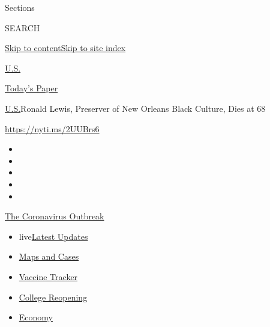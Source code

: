 Sections

SEARCH

\protect\hyperlink{site-content}{Skip to
content}\protect\hyperlink{site-index}{Skip to site index}

\href{https://www.nytimes3xbfgragh.onion/section/us}{U.S.}

\href{https://myaccount.nytimes3xbfgragh.onion/auth/login?response_type=cookie\&client_id=vi}{}

\href{https://www.nytimes3xbfgragh.onion/section/todayspaper}{Today's
Paper}

\href{/section/us}{U.S.}\textbar{}Ronald Lewis, Preserver of New Orleans
Black Culture, Dies at 68

\url{https://nyti.ms/2UUBrs6}

\begin{itemize}
\item
\item
\item
\item
\item
\end{itemize}

\href{https://www.nytimes3xbfgragh.onion/news-event/coronavirus?action=click\&pgtype=Article\&state=default\&region=TOP_BANNER\&context=storylines_menu}{The
Coronavirus Outbreak}

\begin{itemize}
\tightlist
\item
  live\href{https://www.nytimes3xbfgragh.onion/2020/08/04/world/coronavirus-covid-19.html?action=click\&pgtype=Article\&state=default\&region=TOP_BANNER\&context=storylines_menu}{Latest
  Updates}
\item
  \href{https://www.nytimes3xbfgragh.onion/interactive/2020/us/coronavirus-us-cases.html?action=click\&pgtype=Article\&state=default\&region=TOP_BANNER\&context=storylines_menu}{Maps
  and Cases}
\item
  \href{https://www.nytimes3xbfgragh.onion/interactive/2020/science/coronavirus-vaccine-tracker.html?action=click\&pgtype=Article\&state=default\&region=TOP_BANNER\&context=storylines_menu}{Vaccine
  Tracker}
\item
  \href{https://www.nytimes3xbfgragh.onion/2020/08/02/us/covid-college-reopening.html?action=click\&pgtype=Article\&state=default\&region=TOP_BANNER\&context=storylines_menu}{College
  Reopening}
\item
  \href{https://www.nytimes3xbfgragh.onion/live/2020/08/03/business/stock-market-today-coronavirus?action=click\&pgtype=Article\&state=default\&region=TOP_BANNER\&context=storylines_menu}{Economy}
\end{itemize}

